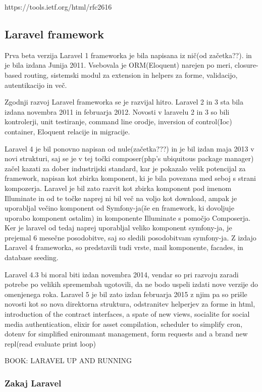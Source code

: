 \documentclass[12pt,a4paper,titlepage,openany]{report}
\begin{document}
https://tools.ietf.org/html/rfc2616


\subsection{Laravel framework}
Prva beta verzija Laravel 1 frameworka je bila napisana iz nič(od začetka??). in je bila izdana Junija 2011. Vsebovala je ORM(Eloquent) narejen po meri, closure-based routing, sistemski modul za extension in helpers za forme, validacijo, autentikacijo in več.

Zgodnji razvoj Laravel frameworka se je razvijal hitro. Laravel 2 in 3 sta bila izdana novembra 2011 in februarja 2012. Novosti v laravelu 2 in 3 so bili kontrolerji, unit testiranje, command line orodje, inversion of control(Ioc) container, Eloquent relacije in migracije.

Laravel 4 je bil ponovno napisan od nule(začetka???) in je bil izdan maja 2013 v novi strukturi, saj se je v tej točki composer(php's ubiquitous package manager) začel kazati za dober industrijski standard, kar je pokazalo velik potencijal za framework, napisan kot zbirka komponent, ki je bila povezana med seboj s strani kompozerja. Laravel je bil zato razvit kot zbirka komponent pod imenom Illuminate in od te točke naprej ni bil več na voljo kot download, ampak je uporabljal večino komponent od Symfony-ja(še en framework, ki dovoljuje uporabo komponent ostalim) in komponente Illuminate s pomočjo Composerja. Ker je laravel od tedaj naprej uporabljal veliko komponent symfony-ja, je prejemal 6 mesečne posodobitve, saj so sledili posodobitvam symfony-ja. Z izdajo Laravel 4 frameworka, so predstavili tudi vrste, mail komponente, facades, in database seeding.

Laravel 4.3 bi moral biti izdan novembra 2014, vendar so pri razvoju zaradi potrebe po velikih spremembah ugotovili, da ne bodo uspeli izdati nove verzije do omenjenega roka. Laravel 5 je bil zato izdan februarja 2015 z njim pa so prišle novosti kot so nova direktorna struktura, odstranitev helperjev za forme in html, introduction of the contract interfaces, a spate of new views, socialite for social media authentication, elixir for asset compilation, scheduler to simplify cron, dotenv for simplified enironmant management, form requests and a brand new repl(read evaluate print loop)


BOOK: LARAVEL UP AND RUNNING

\subsubsection{Zakaj Laravel}
\end{document}
